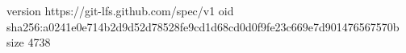 version https://git-lfs.github.com/spec/v1
oid sha256:a0241e0e714b2d9d52d78528fe9cd1d68cd0d0f9fe23c669e7d901476567570b
size 4738
